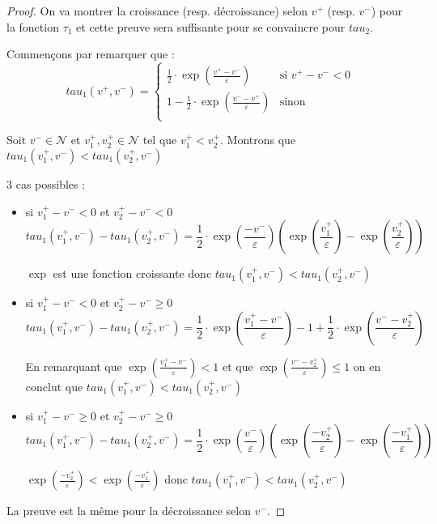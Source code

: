 \documentclass[12pt]{article}
\theoremstyle{defi}
\theoremstyle{not}
\theoremstyle{prob}
\begin{document}
      \begin{proof}
        On va montrer la croissance (resp. décroissance) selon $v^+$ (resp. $v^-$) pour la fonction $\tau_1$ et cette preuve sera suffisante pour se convaincre pour $tau_2$.

        Commençons par remarquer que :
        $$tau_1(v^+, v^-) = \left\{
          \begin{array}{ll}
            \frac{1}{2} \cdot \exp(\frac{v^+ - v^-}{\varepsilon})  & \mbox{si } v^+ - v^- < 0 \\
            1 - \frac{1}{2} \cdot \exp(\frac{v^- - v^+}{\varepsilon}) & \mbox{sinon} \\
          \end{array}
        \right.$$

        Soit $v^- \in \mathcal{N}$ et $v_1^+, v_2^+ \in \mathcal{N}$ tel que $v_1^+ < v_2^+$. Montrons que $tau_1(v_1^+, v^-) < tau_1(v_2^+, v^-)$

        3 cas possibles :
        \begin{itemize}
          \item si $v_1^+ - v^- < 0$ et $v_2^+ - v^- < 0$
          $$tau_1(v_1^+, v^-) - tau_1(v_2^+, v^-) = \frac{1}{2} \cdot \exp(\frac{- v^-}{\varepsilon})(\exp(\frac{v_1^+}{\varepsilon}) - \exp(\frac{v_2^+}{\varepsilon}))$$

          $\exp$ est une fonction croissante donc $tau_1(v_1^+, v^-) < tau_1(v_2^+, v^-)$

          \item si $v_1^+ - v^- < 0$ et $v_2^+ - v^- \geq 0$
          $$tau_1(v_1^+, v^-) - tau_1(v_2^+, v^-) = \frac{1}{2} \cdot \exp(\frac{v_1^+ - v^-}{\varepsilon}) - 1 + \frac{1}{2} \cdot \exp(\frac{v^- - v_2^+}{\varepsilon})$$

          En remarquant que $\exp(\frac{v_1^+ - v^-}{\varepsilon}) < 1$ et que $\exp(\frac{v^- - v_2^+}{\varepsilon}) \leq 1$ on en conclut que $tau_1(v_1^+, v^-) < tau_1(v_2^+, v^-)$

          \item si $v_1^+ - v^- \geq 0$ et $v_2^+ - v^- \geq 0$
          $$tau_1(v_1^+, v^-) - tau_1(v_2^+, v^-) = \frac{1}{2} \cdot \exp(\frac{v^-}{\varepsilon})(\exp(\frac{- v_2^+}{\varepsilon}) - \exp(\frac{- v_1^+}{\varepsilon}))$$

          $\exp(\frac{- v_2^+}{\varepsilon}) < \exp(\frac{- v_1^+}{\varepsilon})$ donc $tau_1(v_1^+, v^-) < tau_1(v_2^+, v^-)$
        \end{itemize}

        La preuve est la même pour la décroissance selon $v^-$.
      \end{proof}
\end{document}
